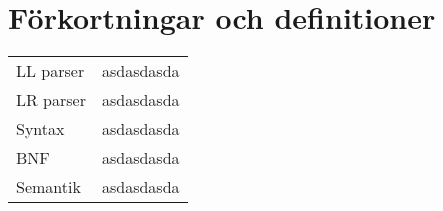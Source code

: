 \section*{Förkortningar och definitioner}

\begin{tabular}{l l}
  LL parser & asdasdasda \\
  LR parser & asdasdasda \\
  Syntax & asdasdasda \\
  BNF & asdasdasda \\
  Semantik & asdasdasda \\
\end{tabular}

\clearpage
